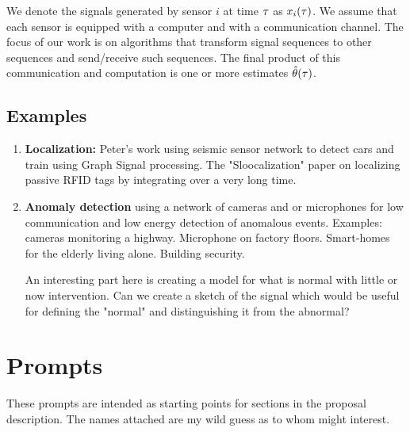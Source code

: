 \documentclass{article}
\newcommand{\comment}[3]{{\color{#1} {\bf #2 :} #3}}
\newcommand{\yoav}[1]{\comment{magenta}{Yoav}{#1}}
\begin{document}
We denote the signals generated by sensor $i$ at time $\tau$ as $x_i(\tau)$. We assume that each sensor is equipped with a computer and with a communication channel. The focus of our work is on algorithms that transform signal sequences to other sequences and send/receive such sequences. The final product of this communication and computation is one or more estimates $\hat{\theta}(\tau)$.

\subsection{Examples}
\begin{enumerate}
    \item {\bf Localization:} Peter's work using seismic sensor network to detect cars and train using Graph Signal processing\cite{riahi2017}. The "Sloocalization" paper on localizing passive RFID tags by integrating over a very long time.
    \item {\bf Anomaly detection} using a network of cameras and or microphones for low communication and low energy detection of anomalous events. Examples: cameras monitoring a highway. Microphone on factory floors. Smart-homes for the elderly living alone. Building security.
    
    An interesting part here is creating a model for what is normal with little or now intervention. Can we create a sketch of the signal which would be useful for defining the "normal" and distinguishing it from the abnormal?
\end{enumerate}

\iffalse
\section{Prompts}
These prompts are intended as starting points for sections in the proposal description. The names attached are my wild guess as to whom might interest.
\end{document}
